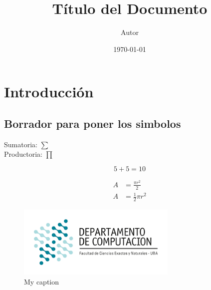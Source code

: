 \documentclass{article}
\title{Título del Documento}
\author{Autor}
\date{\today}
\begin{document}
\maketitle

\section{Introducción}
\subsection{Borrador para poner los simbolos}
Sumatoria: $\sum$ \\
Productoria: $\prod$

\begin{equation}
    5 + 5 = 10
\end{equation}

\begin{equation} \label{eq1}
    \begin{split}
        A & = \frac{\pi r^2}{2} \\
        A & = \frac{1}{2} \pi r^2
    \end{split}
\end{equation}

\begin{figure}[H]
    \centering
    \includegraphics[width=3in]{dc_logo.png}
    \caption{My caption}
    \label{fig:my_label}
\end{figure}
\end{document}
